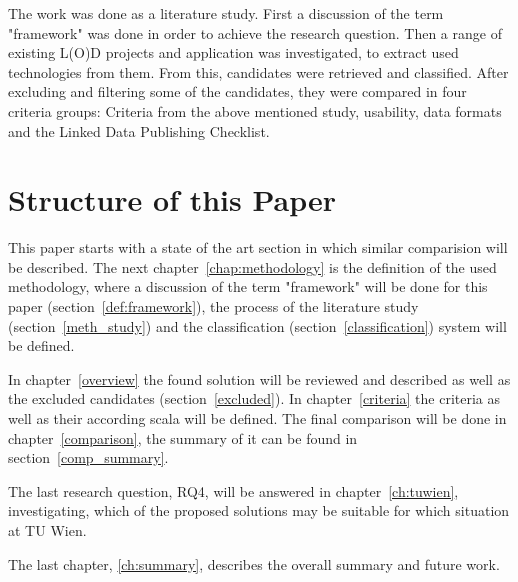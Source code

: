 The work was done as a literature study. First a discussion of the term "framework" was done in order to achieve the research question. Then a range of existing L(O)D projects and application was investigated, to extract used technologies from them. From this, candidates were retrieved and classified. After excluding and filtering some of the candidates, they were compared in four criteria groups: Criteria from the above mentioned study, usability, data formats and the Linked Data Publishing Checklist.

\section{Structure of this Paper}
This paper starts with a state of the art section in which similar comparision will be described. The next chapter~\ref{chap:methodology} is the definition of the used methodology, where a discussion of the term "framework" will be done for this paper (section~\ref{def:framework}), the process of the literature study (section~\ref{meth_study}) and the classification (section~\ref{classification}) system will be defined.

In chapter~\ref{overview} the found solution will be reviewed and described as well as the excluded candidates (section~\ref{excluded}). In chapter~\ref{criteria} the criteria as well as their according scala will be defined. The final comparison will be done in chapter~\ref{comparison}, the summary of it can be found in section~\ref{comp_summary}.

The last research question, RQ4, will be answered in chapter~\ref{ch:tuwien}, investigating, which of the proposed solutions may be suitable for which situation at TU Wien.

The last chapter, \ref{ch:summary}, describes the overall summary and future work.